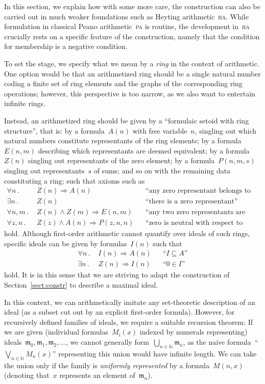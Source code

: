 \documentclass[oneside,reqno]{amsart}
\theoremstyle{definition}
\theoremstyle{plain}
\theoremstyle{remark}
\newcommand{\mmm}{\mathfrak{m}}
\newcommand{\NN}{\mathbb{N}}
\renewcommand{\_}{\mathpunct{.}\,}
\begin{document}
In this section, we explain how with some more care, the construction can also
be carried out in much weaker foundations such as Heyting
arithmetic~\textsc{ha}. While formulation in classical Peano arithmetic~\textsc{pa}
is routine, the development in~\textsc{ha} crucially rests on a specific
feature of the construction, namely that the condition for membership is a
negative condition.

To set the stage, we specify what we mean by a \emph{ring} in the context of
arithmetic. One option would be that an arithmetized ring should be a single
natural number coding a finite set of ring elements and the graphs of the
corresponding ring operations; however, this perspective is too narrow, as we
also want to entertain infinite rings.

Instead, an arithmetized ring should be given by a ``formulaic setoid with ring
structure'', that is: by a formula~$A(n)$ with free
variable~$n$, singling out which natural numbers constitute
representants of the ring elements; by a formula~$E(n,m)$ describing which
representants are deemed equivalent; by a formula~$Z(n)$ singling out
representants of the zero element; by a formula~$P(n,m,s)$ singling out
representants~$s$ of sums; and so on with the remaining data constituting
a ring; such that axioms such as
\begin{align*}
  \forall n\_ & Z(n) \Rightarrow A(n) && \text{``any zero representant belongs to the ring''} \\
  \exists n\_ & Z(n) && \text{``there is a zero representant''} \\
  \forall n,m\_ & Z(n) \wedge Z(m) \Longrightarrow E(n,m) && \text{``any two zero representants are equivalent''} \\
  \forall z,n\_ & Z(z) \wedge A(n) \Longrightarrow P(z,n,n) && \text{``zero is neutral with respect to addition''}
\end{align*}
hold. Although first-order arithmetic cannot quantify over ideals of such
rings, specific ideals can be given by formulas~$I(n)$ such that
\begin{align*}
  \forall n\_ & I(n) \Rightarrow A(n) && \text{``$I \subseteq A$''} \\
  \exists n\_ & Z(n) \Rightarrow I(n) && \text{``$0 \in I$''}
\end{align*}
hold. It is in this sense that we are striving to adapt the construction of
Section~\ref{sect:constr} to describe a maximal ideal.

In this context, we can arithmetically imitate any set-theoretic description of
an ideal (as a subset cut out by an explicit first-order formula). However, for
recursively defined families of ideals, we require a suitable recursion
theorem: If we are given (individual formulas~$M_i(x)$ indexed by numerals
representing) ideals~$\mmm_0,\mmm_1,\mmm_2,\ldots$, we cannot generally
form~$\bigcup_{n\in\NN} \mmm_n$, as the naive formula~``$\bigvee_{n\in\NN} M_n(x)$''
representing this union would have infinite length. We can take the union only
if the family is \emph{uniformly represented} by a formula~$M(n,x)$ (denoting
that~$x$ represents an element of~$\mmm_n$).
\end{document}
